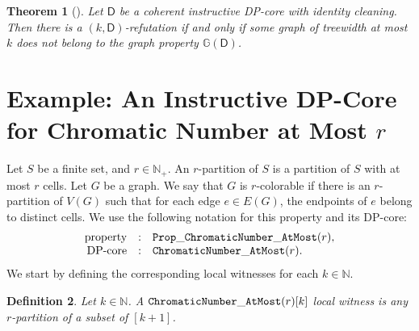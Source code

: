 \documentclass[11pt,a4paper]{article}
\newtheorem{theorem}{Theorem}
\newtheorem{definition}[theorem]{Definition}
\newcommand{\treewidthvalue}{k}
\newcommand{\agraph}{G}
\newcommand{\Nplus}{\mathbb{N}_{+}}
\newcommand{\N}{\mathbb{N}}
\newcommand{\vertexset}[1]{V(#1)}
\newcommand{\edgeset}[1]{E(#1)}
\newcommand{\anedge}{e}
\newcommand{\awitness}{\mathsf{w}}
\newcommand{\dpcoregraphproperty}[1]{\mathbb{G}(#1)}
\newcommand{\dpcore}{\mathsf{D}}
\newcommand{\dpNamePart}[1]{\mbox{\normalfont\ttfamily #1}}
\newcommand{\chromaticNumberAtMostProperty}[1]{\dpNamePart{Prop}\_\allowbreak\dpNamePart{ChromaticNumber}\_\allowbreak\dpNamePart{AtMost}(#1)}
\newcommand{\numbercolors}{r}
\newcommand{\allcolorings}{\mathcal{C}}
\newcommand{\chromaticnumberAtMostCore}[1]{\dpNamePart{ChromaticNumber}\_\allowbreak\dpNamePart{AtMost}(#1)}
\begin{document}
\begin{theorem}[\cite{de2023width}]
\label{theorem:EquivalenceRefutation}
Let $\dpcore$ be a coherent instructive DP-core with identity cleaning. Then there is a $(\treewidthvalue,\dpcore)$-refutation if and only if some graph of treewidth at most $\treewidthvalue$ does not belong to the graph property $\dpcoregraphproperty{\dpcore}$.
\end{theorem}

\section{Example: An Instructive DP-Core for Chromatic Number at Most \texorpdfstring{$\numbercolors$}{r}}
\label{section:ChromaticNumberAtMost}

Let $S$ be a finite set, and $\numbercolors\in \Nplus$. An $\numbercolors$-partition of $S$ is a partition of $S$ with at most $\numbercolors$ cells.
Let $\agraph$ be a graph. We say that $\agraph$ is $\numbercolors$-colorable if there is an $\numbercolors$-partition of
$\vertexset{\agraph}$ such that for each edge $\anedge\in \edgeset{\agraph}$, the endpoints of $\anedge$ belong to distinct cells.
We use the following notation for this property and its DP-core:
\[
\begin{array}{rcl}
\text{property} &:& \chromaticNumberAtMostProperty{\numbercolors},\\
\text{DP-core} &:& \chromaticnumberAtMostCore{\numbercolors}.
\end{array}
\]
We start by defining the corresponding local witnesses for each $\treewidthvalue\in \N$.

\begin{definition}
\label{definition:ChromaticLocalWitness}
Let $\treewidthvalue\in \N$. A $\chromaticnumberAtMostCore{\numbercolors}[\treewidthvalue]$ local witness is any $\numbercolors$-partition of a subset of $[\treewidthvalue+1]$.
\end{definition}



\end{document}
